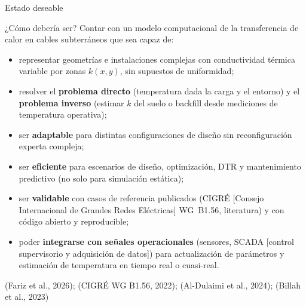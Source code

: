 \documentclass[aspectratio=169]{beamer}
\newcommand{\refcite}[1]{{\footnotesize\color{gray!70!black} #1}}
\begin{document}
\begin{frame}{Estado deseable}
\begin{exampleblock}{¿Cómo debería ser?}
\justifying\small
Contar con un modelo computacional de la transferencia de calor en cables
subterráneos que sea capaz de:
\begin{itemize}[leftmargin=*]
    \item representar geometrías e instalaciones complejas con conductividad
          térmica variable por zonas $k(x,y)$, sin supuestos de uniformidad;
    \item resolver el \textbf{problema directo} (temperatura dada la carga y
          el entorno) y el \textbf{problema inverso} (estimar $k$ del suelo o
          backfill desde mediciones de temperatura operativa);
    \item ser \textbf{adaptable} para distintas configuraciones de diseño sin
          reconfiguración experta compleja;
    \item ser \textbf{eficiente} para escenarios de diseño, optimización,
          DTR y mantenimiento predictivo (no solo para simulación estática);
    \item ser \textbf{validable} con casos de referencia publicados
          (CIGRÉ [Consejo Internacional de Grandes Redes Eléctricas] WG~B1.56, literatura) y con código abierto y reproducible;
    \item poder \textbf{integrarse con señales operacionales} (sensores,
          SCADA [control supervisorio y adquisición de datos]) para actualización de parámetros y estimación de temperatura
          en tiempo real o cuasi-real.
\end{itemize}
\end{exampleblock}
\vspace{0.2em}
\refcite{(Fariz et al., 2026); (CIGRÉ WG B1.56, 2022); (Al-Dulaimi et al., 2024);
(Billah et al., 2023)}
\end{frame}
\end{document}
